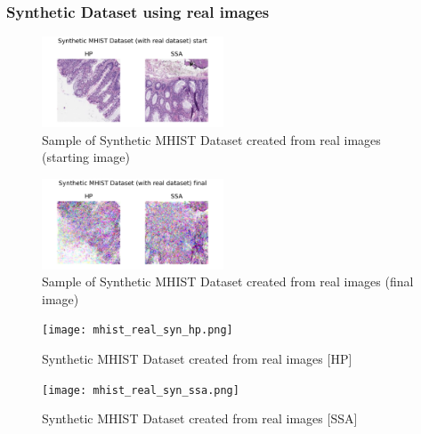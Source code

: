 \documentclass[conference, compsoc]{IEEEtran}
\begin{document}
\subsubsection{Synthetic Dataset using real images}
\begin{figure}[H]
	\centering
	\includegraphics[width=0.48\textwidth]{mhist_real_sample.png}
	\caption{Sample of Synthetic MHIST Dataset created from real images (starting image)}
	\label{fig:mhist_real_sample}
\end{figure}
\begin{figure}[H]
	\centering
	\includegraphics[width=0.48\textwidth]{mhist_real_syn.png}
	\caption{Sample of Synthetic MHIST Dataset created from real images (final image)}
	\label{fig:mhist_real_final}
\end{figure}


\begin{figure}[H]
	\centering
	\texttt{[image: mhist\_real\_syn\_hp.png]}
	\caption{Synthetic MHIST Dataset created from real images [HP]}
	\label{fig:mhist_real_syn_hp}
\end{figure}

\begin{figure}[H]
	\centering
	\texttt{[image: mhist\_real\_syn\_ssa.png]}
	\caption{Synthetic MHIST Dataset created from real images [SSA]}
	\label{fig:mhist_real_syn_ssa}
\end{figure}
\end{document}
